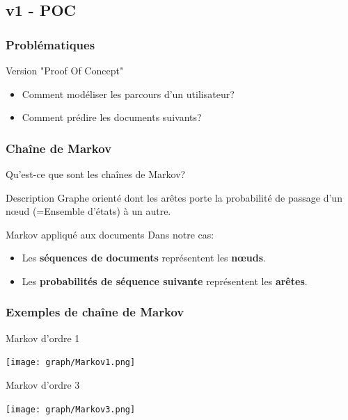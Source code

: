 \documentclass{beamer}
\begin{document}
        \subsection{v1 - POC}
            \begin{frame}
                \frametitle{Problématiques}
                Version "Proof Of Concept"
                \begin{itemize}
                    \pause
                    \item Comment modéliser les parcours d'un utilisateur?
                    \pause
                    \item Comment prédire les documents suivants?
                \end{itemize}
            \end{frame}
            \begin{frame}
                \frametitle{Chaîne de Markov}
                Qu'est-ce que sont les chaînes de Markov?
                \pause
                \begin{block}{Description}
                    Graphe orienté dont les arêtes porte la probabilité de passage d'un nœud (=Ensemble d'états) à un autre.
                \end{block}
                \pause
                \begin{block}{Markov appliqué aux documents}
                    Dans notre cas:
                    \begin{itemize}
                        \item Les \textbf{séquences de documents} représentent les \textbf{nœuds}.
                        \item Les \textbf{probabilités de séquence suivante} représentent les \textbf{arêtes}.
                    \end{itemize}
                \end{block}
            \end{frame}
            \begin{frame}
                \frametitle{Exemples de chaîne de Markov}
                \pause
                \begin{exampleblock}{Markov d'ordre 1}
                    \begin{center}
                        \texttt{[image: graph/Markov1.png]}
                    \end{center}
                \end{exampleblock}
                \pause
                \begin{exampleblock}{Markov d'ordre 3}
                    \begin{center}
                        \texttt{[image: graph/Markov3.png]}
                    \end{center}
                \end{exampleblock}
            \end{frame}
\end{document}
